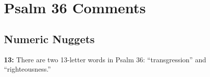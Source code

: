 \section{Psalm 36 Comments}

\subsection{Numeric Nuggets}
\textbf{13: } There are two 13-letter words in Psalm 36: ``transgression'' and ``righteousness.''